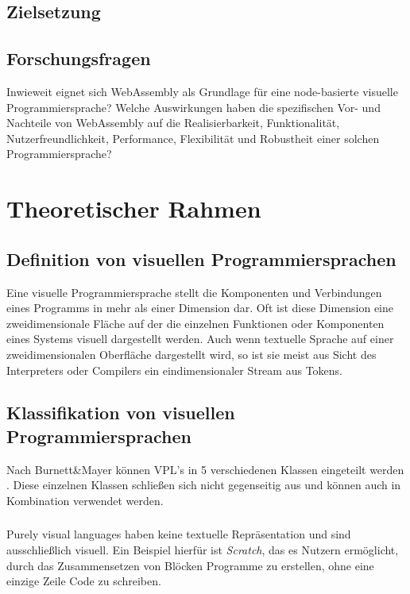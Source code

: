 \documentclass[ngerman]{article}
\begin{document}
\subsection{Zielsetzung} 
\subsection{Forschungsfragen}

Inwieweit eignet sich WebAssembly als Grundlage für eine node-basierte visuelle Programmiersprache?  
\linebreak
\linebreak
Welche Auswirkungen haben die spezifischen Vor- und Nachteile von WebAssembly auf die Realisierbarkeit, Funktionalität, Nutzerfreundlichkeit, Performance, Flexibilität und Robustheit einer solchen Programmiersprache?

\section{Theoretischer Rahmen}

\subsection{Definition von visuellen Programmiersprachen}
Eine visuelle Programmiersprache stellt die Komponenten und Verbindungen eines Programms in mehr als einer Dimension dar. Oft ist diese Dimension eine zweidimensionale Fläche auf der die einzelnen Funktionen oder Komponenten eines Systems visuell dargestellt werden. \cite{Myers}
Auch wenn textuelle Sprache auf einer zweidimensionalen Oberfläche dargestellt wird, so ist sie meist aus Sicht des Interpreters oder Compilers ein eindimensionaler Stream aus Tokens.

\subsection{Klassifikation von visuellen Programmiersprachen}

Nach Burnett\&Mayer können VPL's in 5 verschiedenen Klassen eingeteilt werden \cite{BURNETT1994287}. Diese einzelnen Klassen schließen sich nicht gegenseitig aus und können auch in Kombination verwendet werden.

\subsubsection{}
Purely visual languages haben keine textuelle Repräsentation und sind ausschließlich visuell. Ein Beispiel hierfür ist \textit{Scratch}, das es Nutzern ermöglicht, durch das Zusammensetzen von Blöcken Programme zu erstellen, ohne eine einzige Zeile Code zu schreiben.
\end{document}
